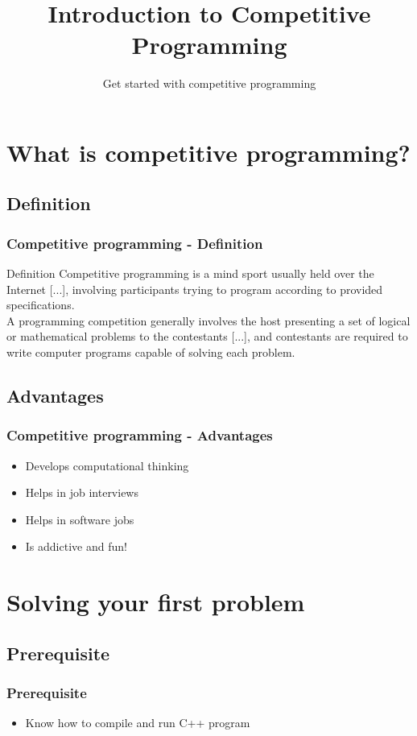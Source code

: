 
\title[Intro to CP]{Introduction to Competitive Programming}
\subtitle[Get started with CP]{Get started with competitive programming}



\section{What is competitive programming?}

\subsection{Definition}
\begin{frame}
    \frametitle{Competitive programming - Definition}
    \begin{alertblock}{Definition}
        Competitive programming is a mind sport usually held over the Internet [...], involving participants trying to program according to provided specifications. \\
        A programming competition generally involves the host presenting a set of logical or mathematical problems to the contestants [...], and contestants are required to write computer programs capable of solving each problem. \\
    \end{alertblock}
\end{frame}

\subsection{Advantages}
\begin{frame}
    \frametitle{Competitive programming - Advantages}
    \begin{itemize}
        \item Develops \alert{computational thinking} \pause
        \item Helps in job interviews \pause
        \item Helps in software jobs \pause
        \item Is addictive and fun! 
    \end{itemize}
\end{frame}

\section{Solving your first problem}
\subsection{Prerequisite}
\begin{frame}
    \frametitle{Prerequisite}
    \begin{itemize}
        \item Know how to compile and run C++ program
    \end{itemize}
\end{frame}

